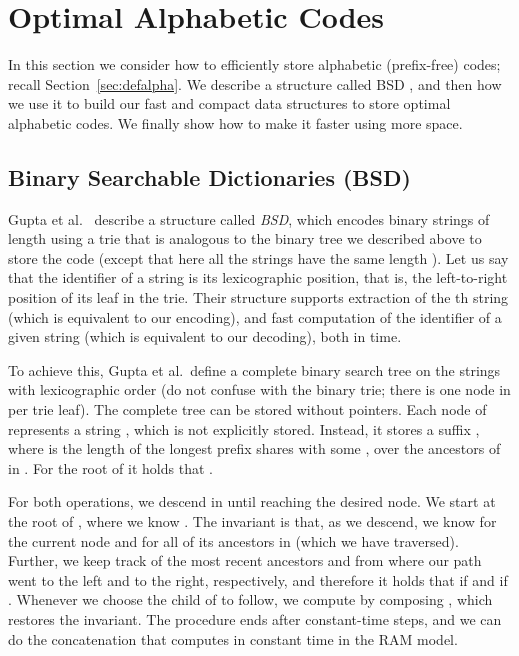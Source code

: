 \documentclass[preprint,12pt]{elsarticle}
\begin{document}
\section{Optimal Alphabetic Codes}
\label{sec:alphabetic}



In this section we consider how to efficiently store alphabetic (prefix-free)
codes; recall Section~\ref{sec:defalpha}.
We describe a structure called BSD \cite{GHSV07}, and then how 
we use it to build our fast and compact data structures to store optimal 
alphabetic codes. We finally show how to make it faster using more space.

\subsection{Binary Searchable Dictionaries (BSD)}

Gupta et al.~\cite{GHSV07} describe a structure called {\em BSD}, which encodes
 binary strings of length  using a trie that is analogous to the binary 
tree  we described above to store the code (except that here all the strings
have the same length ). Let us say that the identifier of a string is its 
lexicographic position, that is, the left-to-right position of its leaf in the
trie. Their structure supports extraction of the th string (which is 
equivalent to our encoding), and fast computation of the identifier of a given 
string (which is equivalent to our decoding), both in  time.

To achieve this, Gupta et al.\ define a complete binary search tree  on the 
strings with lexicographic order (do not confuse  with the binary trie;
there is one node in  per trie leaf). The complete tree can be stored 
without pointers. Each node  of  represents a string , which is not 
explicitly stored. Instead, it stores a suffix , 
where  is the length of the longest prefix  shares with some , 
over the ancestors  of  in . For the root  of  it holds that
.

For both operations, we descend in  until reaching the desired node.
We start at the root  of , where we know . The invariant is that, as
we descend, we know  for the current node  and  for all of its 
ancestors  in  (which we have traversed).
Further, we keep track of the most recent ancestors  and  from where 
our path went to the left and to the right, respectively, and therefore it 
holds that  if  and  if  \cite{GHSV07}.
Whenever we choose the child  of  to follow, we compute
 by composing , which restores 
the invariant. The procedure ends after  constant-time steps, and
we can do the concatenation that computes  in constant time in the RAM 
model.
\end{document}
